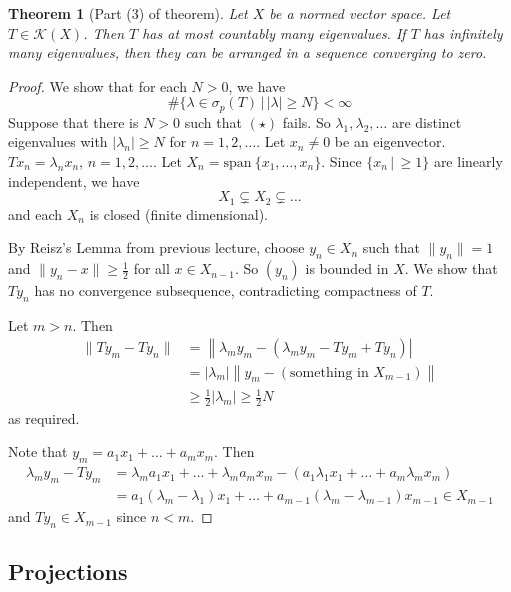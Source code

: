\documentclass[10pt, oneside, reqno]{amsart}
\theoremstyle{plain}%
\newtheorem{thm}{Theorem}[section]
\theoremstyle{definition}
\theoremstyle{remark}
\newcommand{\given}{ \, | \,}
\newcommand{\spans}{\text{span}\ }
\begin{document}
\begin{thm}[Part (3) of theorem]
    Let $X$ be a normed vector space.  Let $T \in \mathcal K(X)$.  Then $T$ has at most countably many eigenvalues.  If $T$ has infinitely many eigenvalues, then they can be arranged in a sequence converging to zero.    
\end{thm}
\begin{proof}
    We show that for each $N > 0$, we have \[
        \#\{ \lambda \in \sigma_p(T) \given | \lambda | \geq N \} < \infty \tag{$\star$}
    \] 
     Suppose that there is $N > 0$ such that $(\star)$ fails.  So $\lambda_1, \lambda_2, \dots$ are distinct eigenvalues with $|\lambda_n | \geq N$ for $n = 1, 2, \dots$.  Let $x_n \neq 0$ be an eigenvector.  $Tx_n = \lambda_n x_n$, $n = 1, 2, \dots$.  Let $X_n = \spans\{ x_1, \dots, x_n \}$.  Since $\{ x_n \given \geq 1 \}$ are linearly independent, we have \[
        X_1 \subsetneq X_2 \subsetneq \dots
    \] and each $X_n$ is closed (finite dimensional). 
    
     By Reisz's Lemma from previous lecture, choose $y_n \in X_n$ such that $\| y_n \| = 1$ and $\| y_n - x \| \geq \frac{1}{2}$ for all $x \in X_{n-1}$.  So $(y_n)$ is bounded in $X$.  We show that $Ty_n$ has no convergence subsequence, contradicting compactness of $T$.  
    
    Let $ m  > n$.  Then \begin{align*}
        \| Ty_m - Ty_n \|   &= \left\| \lambda_m y_m - \left( \lambda_m y_m - Ty_m + Ty_n \right) \right| \\
                            &= |\lambda_m | \left\| y_m - (\text{something in $X_{m-1}$}) \right\| \\
                            &\geq \frac{1}{2}|\lambda_m| \geq \frac{1}{2}N
    \end{align*} as required. 
    
    Note that $y_m = a_1 x_1 + \dots + a_m x_m$.  Then \begin{align*}
        \lambda_m y_m - T y_m &=  \lambda_m a_1 x_1 + \dots + \lambda_m a_m x_m - (a_1 \lambda_1 x_1 + \dots + a_m \lambda_m x_m) \\
        &= a_1(\lambda_m - \lambda_1) x_1 + \dots + a_{m-1}(\lambda_m - \lambda_{m-1}) x_{m-1} \in X_{m-1}
    \end{align*} and $T y_n \in X_{m-1}$ since $n< m$.
    
\end{proof} 

\subsection{Projections} %
\label{sub:projections}
\end{document}
